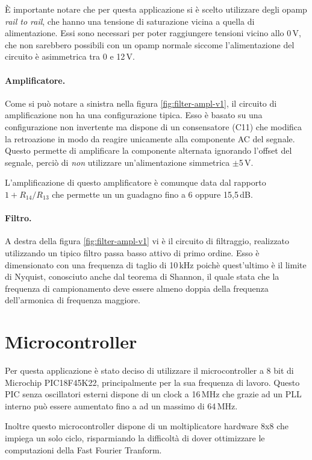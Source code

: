 \`E importante notare che per questa applicazione si \`e scelto utilizzare
degli opamp \emph{rail to rail}, che hanno una tensione di saturazione vicina
a quella di alimentazione. Essi sono necessari per poter raggiungere tensioni
vicino allo 0\,V, che non sarebbero possibili con un opamp normale siccome
l'alimentazione del circuito \`e asimmetrica tra 0 e 12\,V.

\paragraph{Amplificatore.} Come si pu\`o notare a sinistra nella figura
\ref{fig:filter-ampl-v1}, il circuito di amplificazione non ha una configurazione
tipica. Esso \`e basato su una configurazione non invertente ma dispone di un
consensatore (C11) che modifica la retroazione in modo da reagire unicamente
alla componente AC del segnale. Questo permette di amplificare la componente
alternata ignorando l'offset del segnale, perci\`o di \emph{non} utilizzare
un'alimentazione simmetrica \(\pm\)5\,V.

L'amplificazione di questo amplificatore \`e comunque data dal rapporto
\(1+R_{14}/R_{13}\) che permette un un guadagno fino a 6 oppure 15,5\,dB.

\paragraph{Filtro.} A destra della figura \ref{fig:filter-ampl-v1} vi \`e il
circuito di filtraggio, realizzato utilizzando un tipico filtro passa basso
attivo di primo ordine. Esso \`e dimensionato con una frequenza di taglio di
10\,kHz poich\`e quest'ultimo \`e il limite di Nyquist, conosciuto anche dal
teorema di Shannon, il quale stata che la frequenza di campionamento deve
essere almeno doppia della frequenza dell'armonica di frequenza maggiore.


\section{Microcontroller}
Per questa applicazione \`e stato deciso di utilizzare il microcontroller a 8
bit di Microchip PIC18F45K22, principalmente per la sua frequenza di lavoro.
Questo PIC senza oscillatori esterni dispone di un clock a 16\,MHz che grazie
ad un PLL interno pu\`o essere aumentato fino a ad un massimo di 64\,MHz.

Inoltre questo microcontroller dispone di un moltiplicatore hardware 8x8 che
impiega un solo ciclo, risparmiando la difficolt\`a di dover ottimizzare le
computazioni della Fast Fourier Tranform.

